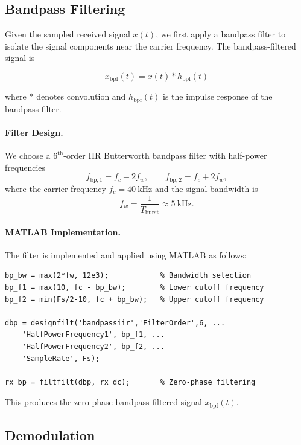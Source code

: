 \documentclass[10pt]{article}
\begin{document}
\subsection*{Bandpass Filtering}

Given the sampled received signal $x(t)$, we first apply a bandpass filter to isolate the signal components near the carrier frequency. The bandpass-filtered signal is

\begin{equation}
x_{\mathrm{bpf}}(t) = x(t) * h_{\mathrm{bpf}}(t)
\end{equation}

where $*$ denotes convolution and $h_{\mathrm{bpf}}(t)$ is the impulse response of the bandpass filter.  

\paragraph{Filter Design.}
We choose a $6^{\text{th}}$-order IIR Butterworth bandpass filter with half-power frequencies
\[
f_{\mathrm{bp},1} = f_c - 2f_w, \qquad
f_{\mathrm{bp},2} = f_c + 2f_w,
\]
where the carrier frequency $f_c = 40~\mathrm{kHz}$ and the signal bandwidth is
\[
f_w = \frac{1}{T_{\mathrm{burst}}} \approx 5~\mathrm{kHz}.
\]

\paragraph{MATLAB Implementation.}
The filter is implemented and applied using MATLAB as follows:

\begin{lstlisting}
bp_bw = max(2*fw, 12e3);            % Bandwidth selection
bp_f1 = max(10, fc - bp_bw);        % Lower cutoff frequency
bp_f2 = min(Fs/2-10, fc + bp_bw);   % Upper cutoff frequency

dbp = designfilt('bandpassiir','FilterOrder',6, ...
    'HalfPowerFrequency1', bp_f1, ...
    'HalfPowerFrequency2', bp_f2, ...
    'SampleRate', Fs);

rx_bp = filtfilt(dbp, rx_dc);       % Zero-phase filtering
\end{lstlisting}

This produces the zero-phase bandpass-filtered signal $x_{\mathrm{bpf}}(t)$.


\subsection*{Demodulation}
\end{document}
